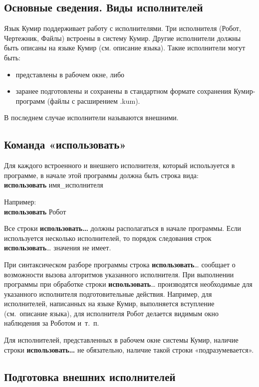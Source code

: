 \documentclass[12pt,a4paper]{article}
\begin{document}
\subsection{Основные сведения. Виды исполнителей}

Язык Кумир поддерживает работу с исполнителями. Три исполнителя (Робот, Чертежник, Файлы) встроены в систему Кумир. Другие исполнители должны быть описаны на языке Кумир (см. описание языка). Такие исполнители могут быть:
\begin{itemize}
\item представлены в рабочем окне, либо
\item заранее подготовлены и сохранены в стандартном формате сохранения Кумир-прог\-рамм (файлы с расширением .kum).
\end{itemize}

В последнем случае исполнители называются внешними. 

\subsection{Команда «использовать»}
\label{use}

Для каждого встроенного и внешнего исполнителя, который используется в программе, в начале этой программы должна быть строка вида:\\
\textsf{\textbf{использовать} имя\_исполнителя}

Например:\\
\textsf{\textbf{использовать} Робот}

Все строки \textsf{\textbf{использовать\dots}} должны располагаться в начале программы. Если используется несколько исполнителей, то порядок следования строк \textsf{\textbf{использовать}\dots} значения не имеет.

При синтаксическом разборе программы строка \textsf{\textbf{использовать}\dots} сообщает о возможности вызова алгоритмов указанного исполнителя. При выполнении программы при обработке строки \textsf{\textbf{использовать}\dots} производятся необходимые для указанного исполнителя подготовительные действия. Например, для исполнителей, написанных на языке Кумир, выполняется вступление (см.~описание языка), для исполнителя Робот делается видимым окно наблюдения за Роботом и~т.~п.

Для исполнителей, представленных в рабочем окне системы Кумир, наличие строки \textsf{\textbf{использовать\dots}} не обязательно, наличие такой строки «подразумевается».

\subsection{Подготовка внешних исполнителей}
\end{document}
